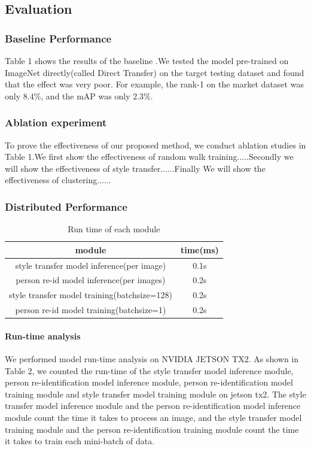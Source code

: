 \documentclass{article}
\begin{document}
\subsection{Evaluation}

\subsubsection{Baseline Performance}
Table 1 shows the results of the baseline .We tested the model pre-trained on ImageNet directly(called Direct Transfer) on the target testing dataset and found that the effect was very poor. For example, the rank-1 on the market dataset was only $8.4\%$, and the mAP was only $2.3\%$. 

\subsubsection{Ablation experiment}
To prove the effectiveness of our proposed method,  we conduct ablation studies in Table 1.We first show the effectiveness of random walk training.....Secondly we will show the effectiveness of style transfer......Finally We will show the effectiveness of clustering......


\subsubsection{Distributed Performance}


\begin{table}
\centering
\begin{tabular}{c|c}
\hline
module  & time(ms) \\
\hline
style transfer model inference(per image)   & 0.1s  \\
person re-id model inference(per images)     & 0.2s  \\
style transfer model training(batchsize=128)    & 0.2s  \\
person re-id model training(batchsize=1)      & 0.2s  \\
\hline
\end{tabular}
\caption{Run time of each module}
\label{tab:plain}
\end{table}


\paragraph{Run-time analysis}
We performed model run-time analysis on NVIDIA JETSON TX2. As shown in Table 2, we counted the run-time of the style transfer model inference module, person re-identification model inference module, person re-identification model training module and style transfer model training module  on jetson tx2. The style transfer model inference module and the person re-identification model inference module count the time it takes to process an image, and the style transfer model training module and the person re-identification training module count the time it takes to train each mini-batch of data.
\end{document}
